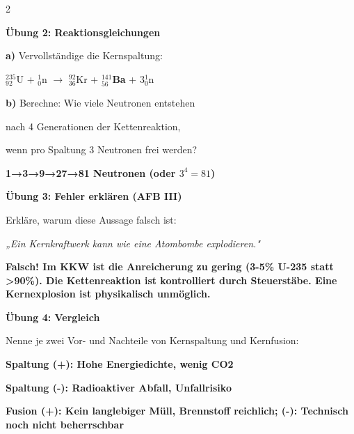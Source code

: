 \documentclass[10pt, a4paper]{article}
\newcommand{\fachfarbe}{physik}
\newcommand{\lsg}[1]{\textcolor{loesung}{\textbf{#1}}}
\newcommand{\abschnitt}[1]{%
    \vspace{8pt}\noindent\textbf{\textcolor{\fachfarbe}{#1}}\vspace{4pt}
}
\begin{document}
\begin{multicols}{2}
\vspace{8pt}


\abschnitt{Übung 2: Reaktionsgleichungen}

\textbf{a)} Vervollständige die Kernspaltung:

$^{235}_{92}$U + $^{1}_{0}$n $\rightarrow$ $^{92}_{36}$Kr + \lsg{$^{141}_{56}$Ba} + 3$^{1}_{0}$n

\vspace{6pt}

\textbf{b)} Berechne: Wie viele Neutronen entstehen

nach 4 Generationen der Kettenreaktion,

wenn pro Spaltung 3 Neutronen frei werden?

\vspace{4pt}
\lsg{1→3→9→27→81 Neutronen (oder $3^4 = 81$)}

\vspace{8pt}


\abschnitt{Übung 3: Fehler erklären (AFB III)}

\begin{fehlerbox}
Erkläre, warum diese Aussage falsch ist:

\vspace{4pt}

\textit{„Ein Kernkraftwerk kann wie eine Atombombe explodieren."}

\vspace{4pt}
\lsg{Falsch! Im KKW ist die Anreicherung zu gering (3-5\% U-235 statt >90\%). Die Kettenreaktion ist kontrolliert durch Steuerstäbe. Eine Kernexplosion ist physikalisch unmöglich.}
\end{fehlerbox}

\vspace{8pt}


\abschnitt{Übung 4: Vergleich}

Nenne je zwei Vor- und Nachteile von Kernspaltung und Kernfusion:

\vspace{4pt}
\lsg{Spaltung (+): Hohe Energiedichte, wenig CO2}

\vspace{4pt}
\lsg{Spaltung (-): Radioaktiver Abfall, Unfallrisiko}

\vspace{4pt}
\lsg{Fusion (+): Kein langlebiger Müll, Brennstoff reichlich; (-): Technisch noch nicht beherrschbar}

\end{multicols}
\end{document}
